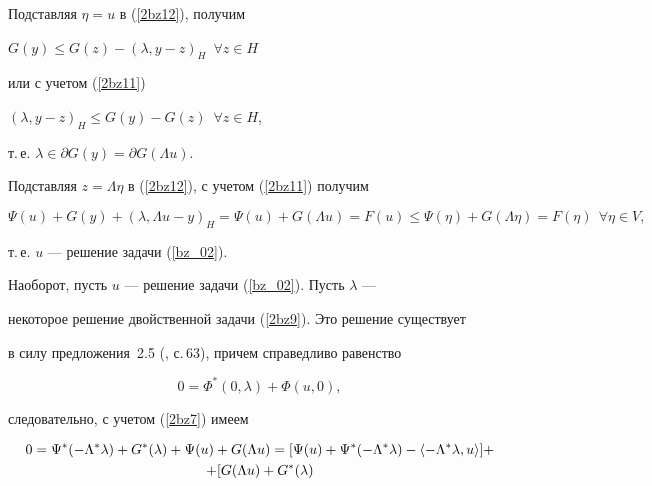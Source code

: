 \begin{pf}
\begin{equation}
\label{2bz12}


\end{equation} 


Подставляя $\eta=u$ в (\ref{2bz12}), получим


$G(y) \leq G(z)-(\lambda , y-z)_H$\, $\forall z \in H$


или с учетом (\ref{2bz11})


$(\lambda , y-z)_H \leq G(y)-G(z)$\, $\forall z \in H$,


т.\,е. $\lambda \in \partial G(y)=\partial G(\Lambda u)$.


Подставляя $z=\Lambda \eta$ в (\ref{2bz12}), с учетом (\ref{2bz11}) получим


$$


\Psi (u)+G(y)+(\lambda , \Lambda u-y)_H=


\Psi (u)+G(\Lambda u)=F (u) \leq 


\Psi (\eta)+G(\Lambda \eta)=F(\eta)


\ \ \forall \eta \in V ,


$$


т.\,е. $u$ --- решение задачи (\ref{bz_02}).





Наоборот, пусть $u$ --- решение задачи (\ref{bz_02}). Пусть $\lambda$ --- 


некоторое решение двойственной задачи (\ref{2bz9}). Это решение существует


в силу предложения~2.5 (\cite{ET_79}, с.\,63), причем справедливо равенство


\begin{equation}


0=\Phi^* (0, \lambda)+\Phi (u, 0), 


\label{2bz12_1}


\end{equation} 


следовательно, с учетом (\ref{2bz7}) имеем


\begin{gather*}


0=\Psi^* (- \Lambda^* \lambda)+G^*(\lambda)+


\Psi (u)+G(\Lambda u)=


[{\Psi (u)+\Psi^* (- \Lambda^* \lambda) 


- \la {-\Lambda^* \lambda, u} \ra}]+ \\


%


+[{G(\Lambda u)+G^*(\lambda) 


}
\end{gather*}
\end{pf}
